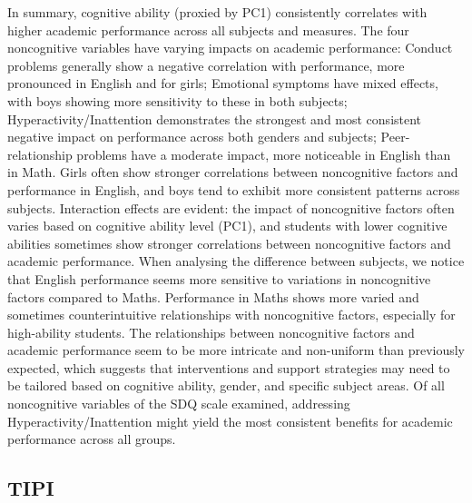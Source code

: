 \documentclass[12pt,a4paper,onecolumn]{article}
\numberwithin{equation}{section}
\begin{document}
In summary, cognitive ability (proxied by PC1) consistently correlates with higher academic performance across all subjects and measures. The four noncognitive variables have varying impacts on academic performance: Conduct problems generally show a negative correlation with performance, more pronounced in English and for girls; Emotional symptoms have mixed effects, with boys showing more sensitivity to these in both subjects; Hyperactivity/Inattention demonstrates the strongest and most consistent negative impact on performance across both genders and subjects; Peer-relationship problems have a moderate impact, more noticeable in English than in Math. Girls often show stronger correlations between noncognitive factors and performance in English, and boys tend to exhibit more consistent patterns across subjects. Interaction effects are evident: the impact of noncognitive factors often varies based on cognitive ability level (PC1), and students with lower cognitive abilities sometimes show stronger correlations between noncognitive factors and academic performance. When analysing the difference between subjects, we notice that English performance seems more sensitive to variations in noncognitive factors compared to Maths. Performance in Maths shows more varied and sometimes counterintuitive relationships with noncognitive factors, especially for high-ability students. The relationships between noncognitive factors and academic performance seem to be more intricate and non-uniform than previously expected, which suggests that interventions and support strategies may need to be tailored based on cognitive ability, gender, and specific subject areas. Of all noncognitive variables of the SDQ scale examined, addressing Hyperactivity/Inattention might yield the most consistent benefits for academic performance across all groups.

\subsection{TIPI}
\end{document}

